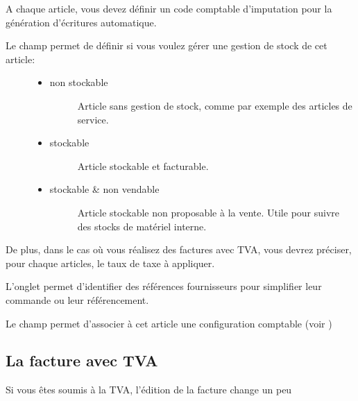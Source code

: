 \documentclass[a4paper,10pt,oneside,french]{sphinxmanual}
\begin{document}
\sphinxAtStartPar
A chaque article, vous devez définir un code comptable d’imputation pour la génération d’écritures automatique.
\begin{description}
\item[{Le champ  permet de définir si vous voulez gérer une gestion de stock de cet article:}] \leavevmode\begin{itemize}
\item {} \begin{description}
\item[{non stockable}] \leavevmode
\sphinxAtStartPar
Article sans gestion de stock, comme par exemple des articles de service.

\end{description}

\item {} \begin{description}
\item[{stockable}] \leavevmode
\sphinxAtStartPar
Article stockable et facturable.

\end{description}

\item {} \begin{description}
\item[{stockable \& non vendable}] \leavevmode
\sphinxAtStartPar
Article stockable non proposable à la vente.
Utile pour suivre des stocks de matériel interne.

\end{description}

\end{itemize}

\end{description}

\sphinxAtStartPar
De plus, dans le cas où vous réalisez des factures avec TVA, vous devrez préciser, pour chaque articles, le taux de taxe à appliquer.

\sphinxAtStartPar
L’onglet  permet d’identifier des références fournisseurs pour simplifier leur commande ou leur référencement.

\sphinxAtStartPar
Le champ  permet d’associer à cet article une configuration comptable (voir )


\subsection{La facture avec TVA}
\label{\detokenize{invoice/articles:la-facture-avec-tva}}
\sphinxAtStartPar
Si vous êtes soumis à la TVA, l’édition de la facture change un peu
\end{document}
